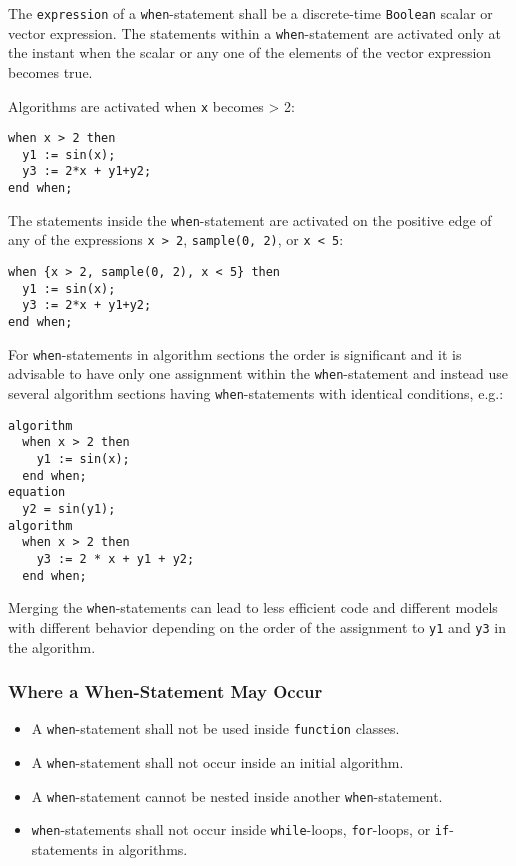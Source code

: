 The \lstinline!expression! of a \lstinline!when!-statement shall be a discrete-time \lstinline!Boolean! scalar or vector expression.
The statements within a \lstinline!when!-statement are activated only at the instant when the scalar or any one of the elements of the vector expression becomes true.

\begin{example}
Algorithms are activated when \lstinline!x! becomes \textgreater{} 2:
\begin{lstlisting}[language=modelica]
when x > 2 then
  y1 := sin(x);
  y3 := 2*x + y1+y2;
end when;
\end{lstlisting}
The statements inside the \lstinline!when!-statement are activated on the positive edge of any of the expressions \lstinline!x > 2!, \lstinline!sample(0, 2)!, or \lstinline!x < 5!:
\begin{lstlisting}[language=modelica]
when {x > 2, sample(0, 2), x < 5} then
  y1 := sin(x);
  y3 := 2*x + y1+y2;
end when;
\end{lstlisting}
For \lstinline!when!-statements in algorithm sections the order is significant and it is advisable to have only one assignment within the \lstinline!when!-statement and instead use several algorithm sections having \lstinline!when!-statements with identical conditions, e.g.:
\begin{lstlisting}[language=modelica]
algorithm
  when x > 2 then
    y1 := sin(x);
  end when;
equation
  y2 = sin(y1);
algorithm
  when x > 2 then
    y3 := 2 * x + y1 + y2;
  end when;
\end{lstlisting}
Merging the \lstinline!when!-statements can lead to less efficient code and different models with different behavior depending on the order of the assignment to \lstinline!y1! and \lstinline!y3! in the algorithm.
\end{example}

\subsubsection{Where a When-Statement May Occur}\label{restrictions-on-where-a-when-statement-may-occur}\label{where-a-when-statement-may-occur}

\begin{itemize}
\item
  A \lstinline!when!-statement shall not be used inside \lstinline!function! classes.
\item
  A \lstinline!when!-statement shall not occur inside an initial algorithm.
\item
  A \lstinline!when!-statement cannot be nested inside another \lstinline!when!-statement.
\item
  \lstinline!when!-statements shall not occur inside \lstinline!while!-loops, \lstinline!for!-loops, or \lstinline!if!-statements in algorithms.
\end{itemize}

